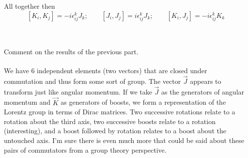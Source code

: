\documentclass[10pt,letterpaper]{article}
\begin{document}
	All together then
	\[
		[K_i,K_j] = -i\epsilon^k_{ij}J_k;\qquad [J_i,J_j] = i\epsilon_{ij}^kJ_k;\qquad [K_i,J_j] = -i\epsilon_{ij}^k K_k
	\]
	\\ \\
	\item
	Comment on the results of the previous part.
	\\ \\
	We have 6 independent elements (two vectors) that are closed under commutation and thus form some sort of
	group. The vector $\vec J$ appears to transform just like angular momentum. If we take $\vec J$ as the 
	generators of angular momentum and $\vec K$ as generators of boosts, we form a representation 
	of the Lorentz group in terms of Dirac matrices. Two successive rotations relate to a rotation about the third axis,
	two successive boosts relate to a rotation (interesting), and a boost followed by rotation relates to a boost
	about the untouched axis. I'm sure there is even much more that could be said about these
	pairs of commutators from a group theory perspective. 
	
	\eenum
	\eenum
\end{document}

